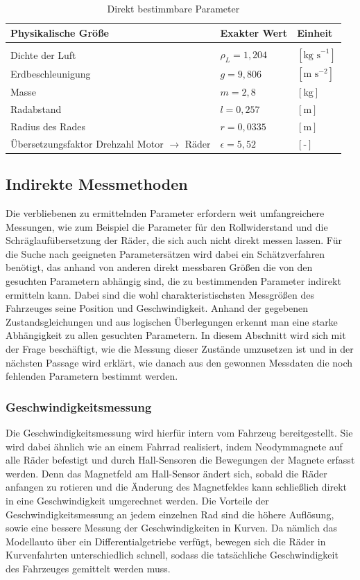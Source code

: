 \begin{table}[H]
\centering
\begin{tabularx}{\columnwidth}{p{8cm}|p{4cm}|p{4cm}}
  \textbf{Physikalische Größe} & \textbf{Exakter Wert}& \textbf{Einheit}\\\hline\hline 
	\rule{0pt}{1mm} & &\\
	Dichte der Luft & $\rho_{L}=1,204$ & $[\text{kg s}^{-1} ]$\\
	Erdbeschleunigung& $g=9,806$ & $[\text{m s}^{-2}]$\\
	Masse& $m=2,8$ & $[\text{kg}]$\\
  	Radabstand& $l=0,257$ & $[\text{m}]$\\
	Radius des Rades & $r=0,0335$ & $[\text{m}]$\\
	Übersetzungsfaktor Drehzahl Motor $\rightarrow$ Räder  & $\epsilon=5,52$ & $[\text{-}]$
\end{tabularx}
\caption{Direkt bestimmbare Parameter \label{tab:Pardir}}
\end{table} 
\subsection{Indirekte Messmethoden}
Die verbliebenen zu ermittelnden Parameter erfordern weit umfangreichere Messungen, wie zum Beispiel die Parameter für den Rollwiderstand und die Schräglaufübersetzung der Räder, die sich auch nicht direkt messen lassen. Für die Suche nach geeigneten Parametersätzen wird dabei ein Schätzverfahren benötigt, das anhand von anderen direkt messbaren Größen die von den gesuchten Parametern abhängig sind, die zu bestimmenden Parameter indirekt ermitteln kann. Dabei sind die wohl charakteristischsten Messgrößen des Fahrzeuges seine Position und Geschwindigkeit. Anhand der gegebenen Zustandsgleichungen und aus logischen Überlegungen erkennt man eine starke Abhängigkeit zu allen gesuchten Parametern. In diesem Abschnitt wird sich mit der Frage beschäftigt, wie die Messung dieser Zustände umzusetzen ist und in der nächsten Passage wird erklärt, wie danach aus den gewonnen Messdaten die noch fehlenden Parametern bestimmt werden.
\subsubsection{Geschwindigkeitsmessung}
Die Geschwindigkeitsmessung wird hierfür intern vom Fahrzeug bereitgestellt. Sie wird dabei ähnlich wie an einem Fahrrad realisiert, indem Neodymmagnete auf alle Räder befestigt und durch Hall-Sensoren die Bewegungen der Magnete erfasst werden. Denn das Magnetfeld am Hall-Sensor ändert sich, sobald die Räder anfangen zu rotieren und die Änderung des Magnetfeldes kann schließlich direkt in eine Geschwindigkeit umgerechnet werden. Die Vorteile der Geschwindigkeitsmessung an jedem einzelnen Rad sind die höhere Auflösung, sowie eine bessere Messung der Geschwindigkeiten in Kurven. Da nämlich das Modellauto über ein Differentialgetriebe verfügt, bewegen sich die Räder in Kurvenfahrten unterschiedlich schnell, sodass die tatsächliche Geschwindigkeit des Fahrzeuges gemittelt werden muss.
